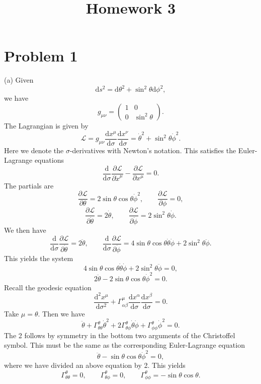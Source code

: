 \documentclass[11pt, letterpaper]{article}
\title{Homework 3}
\theoremstyle{plain}
\begin{document}
\makeproblem
\section{Problem 1}

(a) Given
\[
	\mathrm{d} s^2=\mathrm{d} \theta ^2+\sin ^2\theta \mathrm{d} \phi ^2,
\]
we have
\[
	g_{\mu \nu } =\begin{pmatrix}
	1 & 0 \\
	0 & \sin ^2\theta 
	\end{pmatrix}
.\]
The Lagrangian is given by
\[
	\mathcal{L} =g_{\mu \nu } \frac{\mathrm{d}x^\mu }{\mathrm{d}\sigma } \frac{\mathrm{d}x^\nu }{\mathrm{d}\sigma } =\dot{\theta } ^2+\sin ^2\theta \dot{\phi } ^2
.\]
Here we denote the $\sigma $-derivatives with Newton's notation. This satisfies the Euler-Lagrange equations
\[
	\frac{\mathrm{d}}{\mathrm{d}\sigma } \frac{\partial \mathcal{L} }{\partial \dot{x} ^\mu } -\frac{\partial \mathcal{L} }{\partial x^\mu } =0
.\]
The partials are
\[
	\frac{\partial \mathcal{L} }{\partial \theta } =2 \sin \theta \cos \theta \dot{\phi } ^2,\qquad \frac{\partial \mathcal{L} }{\partial \phi } =0,
\]
\[
	\frac{\partial \mathcal{L} }{\partial \dot{\theta } } =2 \dot{\theta } ,\qquad \frac{\partial \mathcal{L} }{\partial \dot{\phi } } = 2\sin ^2\theta \dot{\phi } 
.\]
We then have
\[
	\frac{\mathrm{d}}{\mathrm{d}\sigma } \frac{\partial \mathcal{L} }{\partial \dot{\theta } } =2 \ddot{\theta } ,\qquad \frac{\mathrm{d}}{\mathrm{d}\sigma  } \frac{\partial \mathcal{L} }{\partial \dot{\phi } } =4 \sin \theta \cos \theta \dot{\theta } \dot{\phi } +2 \sin ^2\theta \ddot{\phi } 
.\]
This yields the system
\[
	4 \sin \theta \cos \theta \dot{\theta } \dot{\phi } +  2 \sin ^2\theta \ddot{\phi } =0,
\]
\[
	2\ddot{\theta } - 2\sin\theta \cos \theta \dot{\phi } ^2=0
.\]
Recall the geodesic equation
\[
	\frac{\mathrm{d}^2x^\mu }{\mathrm{d}\sigma ^2} +\Gamma _{\alpha \beta } ^\mu  \frac{\mathrm{d}x^\alpha }{\mathrm{d}\sigma } \frac{\mathrm{d}x^\beta }{\mathrm{d}\sigma } =0
.\]
Take $\mu =\theta $. Then we have
\[
	\ddot{\theta } +\Gamma ^\theta _{\theta \theta } \dot{\theta } ^2 + 2\Gamma ^\theta _{\theta \phi } \dot{\theta } \dot{\phi } +\Gamma ^\theta _{\phi \phi } \dot{\phi } ^2=0
.\]
The 2 follows by symmetry in the bottom two arguments of the Christoffel symbol. This must be the same as the corresponding Euler-Lagrange equation
\[
	\ddot{\theta } - \sin \theta \cos \theta \dot{\phi } ^2=0,
\]
where we have divided an above equation by 2. This yields
\[
	\Gamma ^\theta _{\theta \theta } =0,\qquad \Gamma _{\theta \phi } ^\theta =0,\qquad \Gamma ^\theta _{\phi \phi } =-\sin \theta \cos \theta 
.\]
\end{document}
